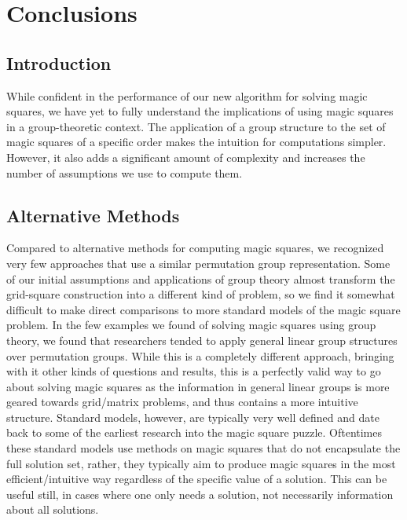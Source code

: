 \documentclass[12pt]{report}
\begin{document}
\chapter{Conclusions}

\section{Introduction}

\par While confident in the performance of our new algorithm for solving magic squares, we have yet
to fully understand the implications of using magic squares in a group-theoretic context. The
application of a group structure to the set of magic squares of a specific order makes the
intuition for computations simpler. However, it also adds a significant amount of complexity and
increases the number of assumptions we use to compute them.

\section{Alternative Methods}

\par Compared to alternative methods for computing magic squares, we recognized very few approaches
that use a similar permutation group representation. Some of our initial assumptions and
applications of group theory almost transform the grid-square construction into a different kind of
problem, so we find it somewhat difficult to make direct comparisons to more standard models of the
magic square problem. In the few examples we found of solving magic squares using group theory, we
found that researchers tended to apply general linear group structures over permutation groups.
While this is a completely different approach, bringing with it other kinds of questions and
results, this is a perfectly valid way to go about solving magic squares as the information in
general linear groups is more geared towards grid/matrix problems, and thus contains a more
intuitive structure. Standard models, however, are typically very well defined and date back to
some of the earliest research into the magic square puzzle. Oftentimes these standard models use
methods on magic squares that do not encapsulate the full solution set, rather, they typically aim
to produce magic squares in the most efficient/intuitive way regardless of the specific value of a
solution. This can be useful still, in cases where one only needs a solution, not necessarily
information about all solutions.
\end{document}
